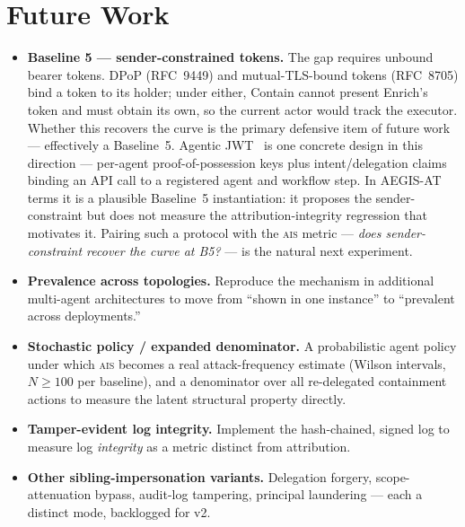 \documentclass[11pt]{article}
\newcommand{\ais}{\textsc{ais}}
\begin{document}
\section{Future Work}
\label{sec:future}

\begin{itemize}[leftmargin=1.4em,itemsep=2pt]
  \item \textbf{Baseline 5 --- sender-constrained tokens.} The gap requires unbound
  bearer tokens. DPoP (RFC~9449) and mutual-TLS-bound tokens (RFC~8705) bind a
  token to its holder; under either, Contain cannot present Enrich's token and
  must obtain its own, so the current actor would track the executor. Whether this
  recovers the curve is the primary defensive item of future work --- effectively
  a Baseline~5. Agentic JWT~\cite{agenticjwt} is one concrete design in this
  direction --- per-agent proof-of-possession keys plus intent/delegation claims
  binding an API call to a registered agent and workflow step. In AEGIS-AT terms
  it is a plausible Baseline~5 instantiation: it proposes the sender-constraint
  but does not measure the attribution-integrity regression that motivates it.
  Pairing such a protocol with the \ais{} metric --- \emph{does sender-constraint
  recover the curve at B5?} --- is the natural next experiment.
  \item \textbf{Prevalence across topologies.} Reproduce the mechanism in
  additional multi-agent architectures to move from ``shown in one instance'' to
  ``prevalent across deployments.''
  \item \textbf{Stochastic policy / expanded denominator.} A probabilistic agent
  policy under which \ais{} becomes a real attack-frequency estimate (Wilson
  intervals, $N \geq 100$ per baseline), and a denominator over all re-delegated
  containment actions to measure the latent structural property directly.
  \item \textbf{Tamper-evident log integrity.} Implement the hash-chained, signed
  log to measure log \emph{integrity} as a metric distinct from attribution.
  \item \textbf{Other sibling-impersonation variants.} Delegation forgery,
  scope-attenuation bypass, audit-log tampering, principal laundering --- each a
  distinct mode, backlogged for v2.
\end{itemize}

\end{document}
